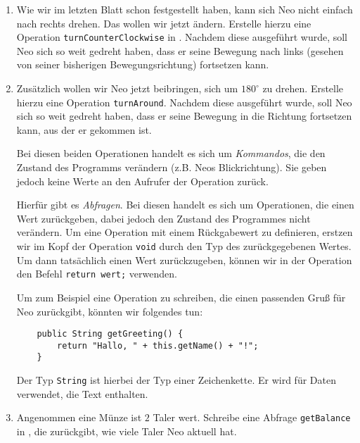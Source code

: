     \begin{enumerate}
        \item
            Wie wir im letzten Blatt schon festgestellt haben, kann sich Neo nicht einfach nach rechts drehen. Das wollen wir jetzt ändern.
            Erstelle hierzu eine Operation \lstinline{turnCounterClockwise} in \ownclass. 
            Nachdem diese ausgeführt wurde, soll Neo sich so weit gedreht haben, dass er seine Bewegung nach links (gesehen von seiner bisherigen Bewegungsrichtung) fortsetzen kann.
    
    
        \item
            Zusätzlich wollen wir Neo jetzt beibringen, sich um \(180^\circ\) zu drehen.
            Erstelle hierzu eine Operation \lstinline{turnAround}.
            Nachdem diese ausgeführt wurde, soll Neo sich so weit gedreht haben, dass er seine Bewegung in die Richtung fortsetzen kann, aus der er gekommen ist.
        
        
            Bei diesen beiden Operationen handelt es sich um \emph{Kommandos}, die den Zustand des Programms verändern (z.B. Neos Blickrichtung). 
            Sie geben jedoch keine Werte an den Aufrufer der Operation zurück.
        
            Hierfür gibt es \emph{Abfragen}. 
            Bei diesen handelt es sich um Operationen, die einen Wert zurückgeben, dabei jedoch den Zustand des Programmes nicht verändern. 
            Um eine Operation mit einem Rückgabewert zu definieren, erstzen wir im Kopf der Operation \lstinline{void} durch den Typ des zurückgegebenen Wertes. 
            Um dann tatsächlich einen Wert zurückzugeben, können wir in der Operation den Befehl \lstinline{return wert;} verwenden.
        
            Um zum Beispiel eine Operation zu schreiben, die einen passenden Gruß für Neo zurückgibt, könnten wir folgendes tun:

            \begin{lstlisting}
    public String getGreeting() {
        return "Hallo, " + this.getName() + "!";
    }
            \end{lstlisting}

            Der Typ \lstinline{String} ist hierbei der Typ einer Zeichenkette. 
            Er wird für Daten verwendet, die Text enthalten.
    
        \item Angenommen eine Münze ist \(2\) Taler wert. 
            Schreibe eine Abfrage \lstinline{getBalance} in \ownclass{}, die zurückgibt, wie viele Taler Neo aktuell hat.
        

\end{enumerate}
